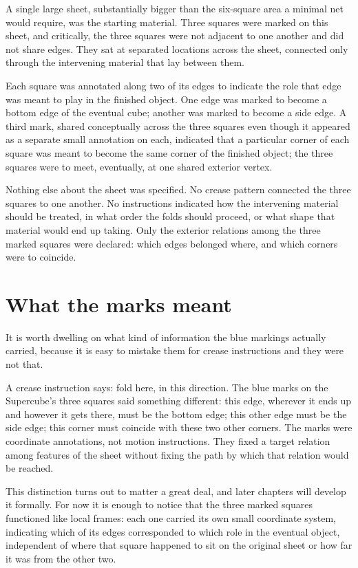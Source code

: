 \documentclass[11pt,oneside]{book}
\begin{document}
A single large sheet, substantially bigger than the six-square area a
minimal net would require, was the starting material. Three squares were
marked on this sheet, and critically, the three squares were not
adjacent to one another and did not share edges. They sat at separated
locations across the sheet, connected only through the intervening
material that lay between them.

Each square was annotated along two of its edges to indicate the role
that edge was meant to play in the finished object. One edge was marked
to become a bottom edge of the eventual cube; another was marked to
become a side edge. A third mark, shared conceptually across the three
squares even though it appeared as a separate small annotation on each,
indicated that a particular corner of each square was meant to become
the same corner of the finished object; the three squares were to meet,
eventually, at one shared exterior vertex.

Nothing else about the sheet was specified. No crease pattern connected
the three squares to one another. No instructions indicated how the
intervening material should be treated, in what order the folds should
proceed, or what shape that material would end up taking. Only the
exterior relations among the three marked squares were declared: which
edges belonged where, and which corners were to coincide.

\hypertarget{what-the-marks-meant}{%
\section{What the marks meant}\label{what-the-marks-meant}}

It is worth dwelling on what kind of information the blue markings
actually carried, because it is easy to mistake them for crease
instructions and they were not that.

A crease instruction says: fold here, in this direction. The blue marks
on the Supercube's three squares said something different: this edge,
wherever it ends up and however it gets there, must be the bottom edge;
this other edge must be the side edge; this corner must coincide with
these two other corners. The marks were coordinate annotations, not
motion instructions. They fixed a target relation among features of the
sheet without fixing the path by which that relation would be reached.

This distinction turns out to matter a great deal, and later chapters
will develop it formally. For now it is enough to notice that the three
marked squares functioned like local frames: each one carried its own
small coordinate system, indicating which of its edges corresponded to
which role in the eventual object, independent of where that square
happened to sit on the original sheet or how far it was from the other
two.
\end{document}

